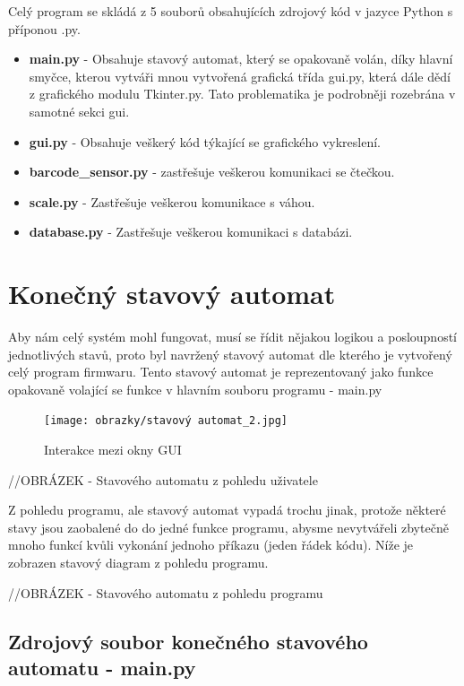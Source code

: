 Celý program se skládá z 5 souborů obsahujících zdrojový kód v jazyce Python s příponou .py.

\begin{itemize}
    \item \textbf{main.py} - Obsahuje stavový automat, který se opakovaně volán, díky hlavní smyčce, kterou vytváři  mnou vytvořená grafická třída gui.py, která dále dědí z grafického modulu Tkinter.py. Tato problematika je podrobněji rozebrána v samotné sekci gui.
    \item \textbf{gui.py} - Obsahuje veškerý kód týkající se grafického vykreslení.
    \item \textbf{barcode\_sensor.py} - zastřešuje veškerou komunikaci se čtečkou.
    \item \textbf{scale.py} - Zastřešuje veškerou komunikace s váhou.
    \item \textbf{database.py} - Zastřešuje veškerou komunikaci s databázi.
\end{itemize}


\section{Konečný stavový automat}
Aby nám celý systém mohl fungovat, musí se řídit nějakou logikou a posloupností jednotlivých stavů, proto byl navržený stavový automat dle kterého je vytvořený celý program firmwaru. Tento stavový automat je reprezentovaný jako funkce opakovaně volající se funkce v hlavním souboru programu - main.py

\begin{figure}[H]
    \begin{center}
        \texttt{[image: obrazky/stavový automat\_2.jpg]}
    \end{center}
    \caption{Interakce mezi okny GUI}
    \label{Interakce mezi okny GUI}
\end{figure}
//OBRÁZEK - Stavového automatu z pohledu uživatele

Z pohledu programu, ale stavový automat vypadá trochu jinak, protože některé stavy jsou zaobalené do do jedné funkce programu, abysme nevytvářeli zbytečně mnoho funkcí kvůli vykonání jednoho příkazu (jeden řádek kódu). Níže je zobrazen stavový diagram z pohledu programu.

//OBRÁZEK - Stavového automatu z pohledu programu

\subsection{Zdrojový soubor konečného stavového automatu - main.py}

